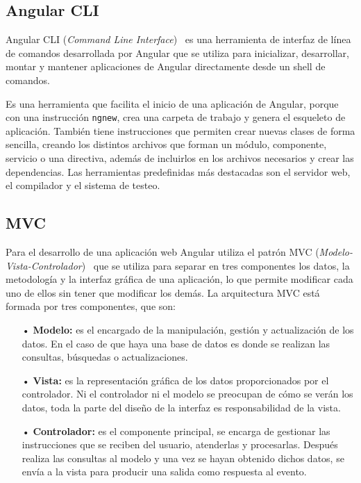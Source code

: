\documentclass[a4paper, 12pt]{book}
\begin{document}
\subsection{Angular CLI}
\label{subsec:Angular CLI}

Angular CLI (\emph{Command Line Interface})~\cite{Pagina_de_angular_CLI} es una herramienta de interfaz de línea de comandos desarrollada por Angular que se utiliza para inicializar, desarrollar, montar y mantener aplicaciones de Angular directamente desde un shell de comandos. 

Es una herramienta que facilita el inicio de una aplicación de Angular, porque con una instrucción \texttt{ngnew}, crea una carpeta de trabajo y genera el esqueleto de aplicación. 
También tiene instrucciones que permiten crear nuevas clases de forma sencilla, creando los distintos archivos que forman un módulo, componente, servicio o una directiva, además de incluirlos en los archivos necesarios y crear las dependencias. 
Las herramientas predefinidas más destacadas son el servidor web, el compilador y el sistema de testeo.

\subsection{MVC}
\label{subsec:MVC}

Para el desarrollo de una aplicación web Angular utiliza el patrón MVC (\emph{Modelo-Vista-Controlador})~\cite{Pagina_MVC} que se utiliza para separar en tres componentes los datos, la metodología y la interfaz gráfica de una aplicación, lo que permite modificar cada uno de ellos sin tener que modificar los demás. 
La arquitectura MVC está formada por tres componentes, que son:
	\begin{itemize}
	\item[•] \textbf{Modelo:} es el encargado de la manipulación, gestión y actualización de los datos. 
	En el caso de que haya una base de datos es donde se realizan las consultas, búsquedas o actualizaciones.  
	
	\item[•] \textbf{Vista:} es la representación gráfica de los datos proporcionados por el controlador. 
	Ni el controlador ni el modelo se preocupan de cómo se verán los datos, toda la parte del diseño de la interfaz es responsabilidad de la vista.
	
	\item[•] \textbf{Controlador:} es el componente principal, se encarga de gestionar las instrucciones que se reciben del usuario, atenderlas y procesarlas. 
	Después realiza las consultas al modelo y una vez se hayan obtenido dichos datos, se envía a la vista para producir una salida como respuesta al evento.
	\end{itemize}
	
\end{document}
